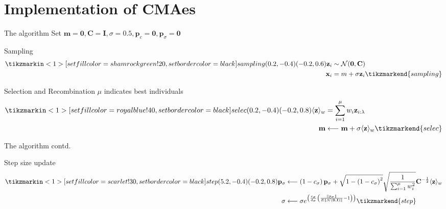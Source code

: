 \documentclass[presentation]{beamer}
\begin{document}
\section{Implementation of CMAes}
\label{sec:orgad027b7}
\begin{frame}[label={sec:org30caf99}]{The algorithm}
Set \(\mathbf{m} = \mathbf{0}, \mathbf{C} = \mathbf{I}, \sigma =
 0.5, \mathbf{p}_c = \mathbf{0}, \mathbf{p}_{\sigma} = \mathbf{0}\)
\begin{block}{Sampling}
\[ \begin{aligned}
	  \tikzmarkin<1>[set fill color=shamrockgreen!20, set border color=black]{sampling}(0.2,-0.4)(-0.2,0.6)
	  \mathbf{z}_{i} & \sim \mathcal{N}(\mathbf{0}, \mathbf{C}) \\
	  \mathbf{x}_{i} &= m+\sigma \mathbf{z}_{i} \tikzmarkend{sampling}
	  \end{aligned} \]
\end{block}

\begin{block}{Selection and Recombination}
\(\mu\) indicates best individuals
  \[ \begin{aligned}
	  \tikzmarkin<1>[set fill color=royalblue!40, set border color=black]{selec}(0.2,-0.4)(-0.2,0.8)
	  \langle\mathbf{z}\rangle_{w} &= \sum_{i=1}^{\mu} w_{i} \mathbf{z}_{i : \lambda} \\
	  \mathbf{m} &\longleftarrow \mathbf{m}+\sigma\langle\mathbf{z}\rangle_{w} \tikzmarkend{selec}
	  \end{aligned} \]
\end{block}
\end{frame}

\begin{frame}[label={sec:org2c2387b}]{The algorithm contd.}
\begin{block}{Step size update}
\[ \begin{aligned}
	 \tikzmarkin<1>[set fill color=scarlet!30, set border color=black]{step}(5.2,-0.4)(-0.2,0.8)
	 \mathbf{p}_{\sigma} &\longleftarrow\left(1-c_{\sigma}\right)
	 \mathbf{p}_{\sigma}+\sqrt{1-\left(1-c_{\sigma}\right)^{2}}
	 \sqrt{\frac{1}{\sum_{i=1}^{\mu} w_{i}^{2}}}
	 \mathbf{C}^{-\frac{1}{2}}\langle\mathbf{z}\rangle_{w} \\
	 \sigma &\longleftarrow \sigma
	 e^{\left(\frac{c_\sigma}{d_{\sigma}}\left(\frac{\left\|p_{\sigma}\right\|}{E\|\mathcal{N}(\mathbf{0},
	 \mathbf{I})\|}-1\right)\right)} \tikzmarkend{step} \\
	 \end{aligned} \]
\end{block}
\end{frame}
\end{document}

